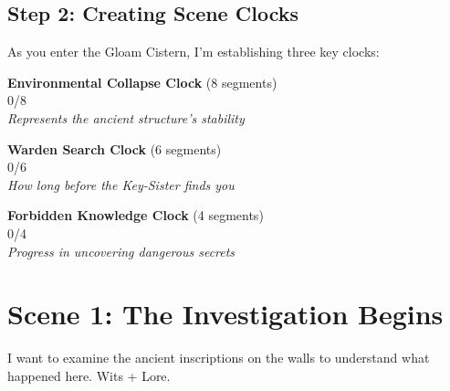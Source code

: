

\subsection*{Step 2: Creating Scene Clocks}

 As you enter the Gloam Cistern, I'm establishing three key clocks:

\begin{center}
\textbf{Environmental Collapse Clock} (8 segments)\\
\fbox{\clocksegment\clocksegment\clocksegment\clocksegment\clocksegment\clocksegment\clocksegment\clocksegment} 0/8\\
\textit{Represents the ancient structure's stability}
\end{center}

\begin{center}
\textbf{Warden Search Clock} (6 segments)\\
\fbox{\clocksegment\clocksegment\clocksegment\clocksegment\clocksegment\clocksegment} 0/6\\
\textit{How long before the Key-Sister finds you}
\end{center}

\begin{center}
\textbf{Forbidden Knowledge Clock} (4 segments)\\
\fbox{\clocksegment\clocksegment\clocksegment\clocksegment} 0/4\\
\textit{Progress in uncovering dangerous secrets}
\end{center}


\section*{Scene 1: The Investigation Begins}

 I want to examine the ancient inscriptions on the walls to understand what happened here. Wits + Lore.



